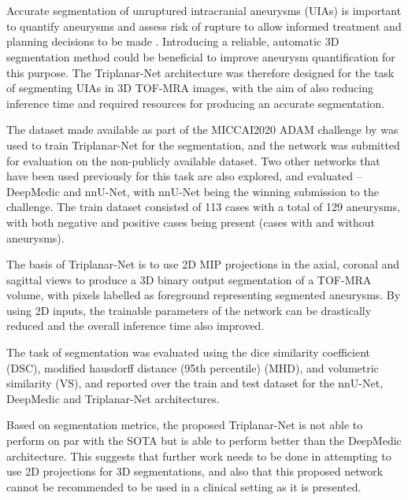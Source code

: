 \chapter*{\abstractname}

Accurate segmentation of unruptured intracranial aneurysms (UIAs) is important to quantify aneurysms and assess risk of rupture to allow informed treatment and planning decisions to be made \cite{White2001}. Introducing a reliable, automatic 3D segmentation method could be beneficial to improve aneurysm quantification for this purpose. The Triplanar-Net architecture was therefore designed for the task of segmenting UIAs in 3D TOF-MRA images, with the aim of also reducing inference time and required resources for producing an accurate segmentation.

The dataset made available as part of the MICCAI2020 ADAM challenge by \citeauthor{Timmins2020} was used to train Triplanar-Net for the segmentation, and the network was submitted for evaluation on the non-publicly available dataset. Two other networks that have been used previously for this task are also explored, and evaluated -- DeepMedic and nnU-Net, with nnU-Net being the winning submission to the challenge. The train dataset consisted of 113 cases with a total of 129 aneurysms, with both negative and positive cases being present (cases with and without aneurysms).

The basis of Triplanar-Net is to use 2D MIP projections in the axial, coronal and sagittal views to produce a 3D binary output segmentation of a TOF-MRA volume, with pixels labelled as foreground representing segmented aneurysms. By using 2D inputs, the trainable parameters of the network can be drastically reduced and the overall inference time also improved.

The task of segmentation was evaluated using the dice similarity coefficient (DSC), modified hausdorff distance (95th percentile) (MHD), and volumetric similarity (VS), and reported over the train and test dataset for the nnU-Net, DeepMedic and Triplanar-Net architectures.

Based on segmentation metrics, the proposed Triplanar-Net is not able to perform on par with the SOTA but is able to perform better than the DeepMedic architecture. This suggests that further work needs to be done in attempting to use 2D projections for 3D segmentations, and also that this proposed network cannot be recommended to be used in a clinical setting as it is presented.